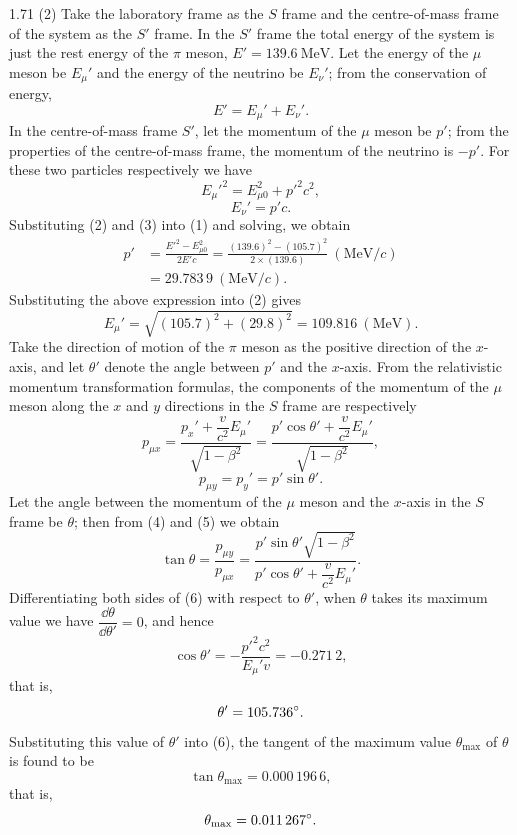\begin{solution}{1.71}
(2) Take the laboratory frame as the $S$ frame and the centre-of-mass frame of the system as the $S'$ frame. In the $S'$ frame the total energy of the system is just the rest energy of the $\pi$ meson, $E'=139.6\ \mathrm{MeV}$. Let the energy of the $\mu$ meson be $E_\mu'$ and the energy of the neutrino be $E_\nu'$; from the conservation of energy,
\begin{equation}
E'=E_\mu'+E_\nu'. \tag{1}
\end{equation}
In the centre-of-mass frame $S'$, let the momentum of the $\mu$ meson be $p'$; from the properties of the centre-of-mass frame, the momentum of the neutrino is $-p'$. For these two particles respectively we have
\begin{equation}
E_\mu'^2=E_{\mu0}^2+p'^2c^2, \tag{2}
\end{equation}
\begin{equation}
E_\nu'=p'c. \tag{3}
\end{equation}
Substituting (2) and (3) into (1) and solving, we obtain
\begin{align*}
p'&=\frac{E'^2-E_{\mu0}^2}{2E'c}=\frac{(139.6)^2-(105.7)^2}{2\times(139.6)}\ (\mathrm{MeV}/c)\\
&=29.783\,9\ (\mathrm{MeV}/c).
\end{align*}
Substituting the above expression into (2) gives
\[
E_\mu'=\sqrt{(105.7)^2+(29.8)^2}=109.816\ (\mathrm{MeV}).
\]
Take the direction of motion of the $\pi$ meson as the positive direction of the $x$-axis, and let $\theta'$ denote the angle between $p'$ and the $x$-axis. From the relativistic momentum transformation formulas, the components of the momentum of the $\mu$ meson along the $x$ and $y$ directions in the $S$ frame are respectively
\begin{equation}
p_{\mu x}=\frac{p_x'+\dfrac{v}{c^2}E_\mu'}{\sqrt{1-\beta^2}}
=\frac{p'\cos\theta'+\dfrac{v}{c^2}E_\mu'}{\sqrt{1-\beta^2}}, \tag{4}
\end{equation}
\begin{equation}
p_{\mu y}=p_y'=p'\sin\theta'. \tag{5}
\end{equation}
Let the angle between the momentum of the $\mu$ meson and the $x$-axis in the $S$ frame be $\theta$; then from (4) and (5) we obtain
\begin{equation}
\tan\theta=\frac{p_{\mu y}}{p_{\mu x}}
=\frac{p'\sin\theta'\sqrt{1-\beta^2}}{p'\cos\theta'+\dfrac{v}{c^2}E_\mu'}. \tag{6}
\end{equation}
Differentiating both sides of (6) with respect to $\theta'$, when $\theta$ takes its maximum value we have $\dfrac{\dd\theta}{\dd\theta'}=0$, and hence
\[
\cos\theta'=-\frac{p'^2c^2}{E_\mu'v}=-0.271\,2,
\]
that is,
\[
\theta'=105.736^{\circ}.
\]
Substituting this value of $\theta'$ into (6), the tangent of the maximum value $\theta_{\max}$ of $\theta$ is found to be
\[
\tan\theta_{\max}=0.000\,196\,6,
\]
that is,
\[
\theta_{\max}=0.011\,267^{\circ}.
\]


\end{solution}
